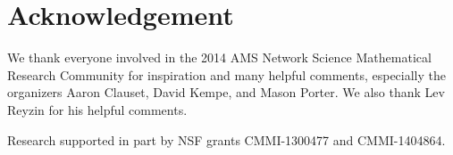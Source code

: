 \documentclass{comnet}
\begin{document}
\section*{Acknowledgement} 

We thank everyone involved in the 2014 AMS Network Science Mathematical
Research Community for inspiration and many helpful comments, especially the
organizers Aaron Clauset, David Kempe, and Mason Porter. We also thank Lev
Reyzin for his helpful comments.

Research supported in part by NSF grants 
CMMI-1300477 and CMMI-1404864. %



\end{document}
